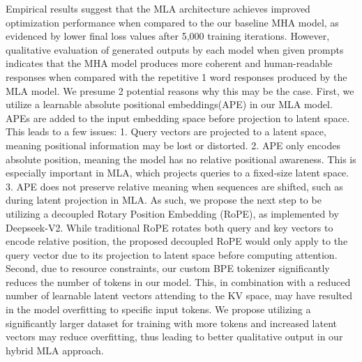 Empirical results suggest that the MLA architecture achieves improved optimization performance when compared to the our baseline MHA model, as evidenced by lower final loss values after 5,000 training iterations. However, qualitative evaluation of generated outputs by each model when given prompts indicates that the MHA model produces more coherent and human-readable responses when compared with the repetitive 1 word responses produced by the MLA model. We presume 2 potential reasons why this may be the case. \newline\newline First, we utilize a learnable absolute positional embeddings(APE) in our MLA model. APEs are added to the input embedding space before projection to latent space. This leads to a few issues: 1. Query vectors are projected to a latent space, meaning positional information may be lost or distorted. 2. APE only encodes absolute position, meaning the model has no relative positional awareness. This is especially important in MLA, which projects queries to a fixed-size latent space\cite{vaswani2023attentionneed}\cite{su2023rope}. 3. APE does not preserve relative meaning when sequences are shifted, such as during latent projection in MLA. As such, we propose the next step to be utilizing a decoupled Rotary Position Embedding (RoPE), as implemented by Deepseek-V2\cite{liu2024deepseekv2}. While traditional RoPE rotates both query and key vectors to encode relative position\cite{su2023rope}, the proposed decoupled RoPE would only apply to the query vector due to its projection to latent space\cite{liu2024deepseekv2} before computing attention. \newline\newline Second, due to resource constraints, our custom BPE tokenizer significantly reduces the number of tokens in our model. This, in combination with a reduced number of learnable latent vectors attending to the KV space, may have resulted in the model overfitting to specific input tokens. We propose utilizing a significantly larger dataset for training with more tokens and increased latent vectors may reduce overfitting, thus leading to better qualitative output in our hybrid MLA approach. 